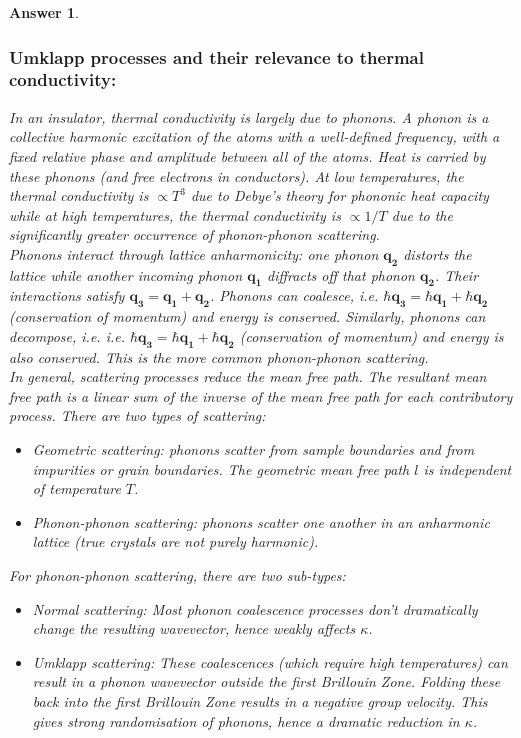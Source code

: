 \documentclass[a4paper]{article}
\newtheorem{ans}{Answer}[subsection]
\theoremstyle{new}
\begin{document}
\begin{ans}\leavevmode
\subsubsection*{Umklapp processes and their relevance to thermal conductivity:}
In an insulator, thermal conductivity is largely due to phonons. A phonon is a collective harmonic excitation of the atoms with a well-defined frequency, with a fixed relative phase and amplitude between all of the atoms. Heat is carried by these phonons (and free electrons in conductors). At low temperatures, the thermal conductivity is $\propto T^3$ due to Debye's theory for phononic heat capacity while at high temperatures, the thermal conductivity is $\propto 1/T$ due to the significantly greater occurrence of phonon-phonon scattering.\\[5pt]
Phonons interact through lattice anharmonicity: one phonon $\mathbf{q_2}$ distorts the lattice while another incoming phonon $\mathbf{q_1}$ diffracts off that phonon $\mathbf{q_2}$. Their interactions satisfy $\mathbf{q_3}=\mathbf{q_1}+\mathbf{q_2}$. Phonons can coalesce, i.e. $\hbar\mathbf{q_3}=\hbar\mathbf{q_1}+\hbar\mathbf{q_2}$ (conservation of momentum) and energy is conserved. Similarly, phonons can decompose, i.e. i.e. $\hbar\mathbf{q_3}=\hbar\mathbf{q_1}+\hbar\mathbf{q_2}$ (conservation of momentum) and energy is also conserved. This is the more common phonon-phonon scattering.\\[5pt]
In general, scattering processes reduce the mean free path. The resultant mean free path is a linear sum of the inverse of the mean free path for each contributory process. There are two types of scattering:
\begin{itemize}
    \item Geometric scattering: phonons scatter from sample boundaries and from impurities or grain boundaries. The geometric mean free path $l$ is independent of temperature $T$.
    \item Phonon-phonon scattering: phonons scatter one another in an anharmonic lattice (true crystals are not purely harmonic). 
\end{itemize}
For phonon-phonon scattering, there are two sub-types:
\begin{itemize}
\item Normal scattering: Most phonon coalescence processes don't dramatically change the resulting wavevector, hence weakly affects $\kappa$.
\item Umklapp scattering: These coalescences (which require high temperatures) can result in a phonon wavevector outside the first Brillouin Zone. Folding these back into the first Brillouin Zone results in a negative group velocity. This gives strong randomisation of phonons, hence a dramatic reduction in $\kappa$.

\end{itemize}
\end{ans}
\end{document}
